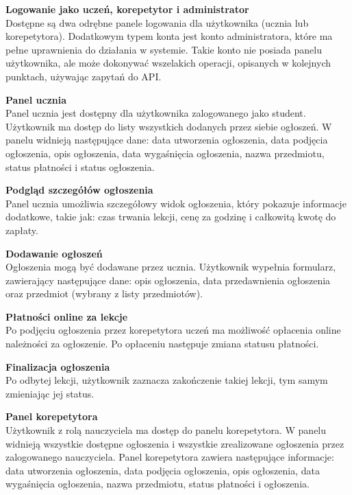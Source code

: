\documentclass[12pt]{article}
\numberwithin{figure}{section}
\begin{document}
\begin{sloppypar}
\noindent
\textbf{Logowanie jako uczeń, korepetytor i administrator}\\
\indent  
Dostępne są dwa odrębne panele logowania dla użytkownika (ucznia lub korepetytora). Dodatkowym typem konta jest konto administratora, które ma pełne uprawnienia do działania w systemie. Takie konto nie posiada panelu użytkownika, ale może dokonywać wszelakich operacji, opisanych w kolejnych punktach, używając zapytań do API.

\noindent
\textbf{Panel ucznia}\\
\indent
Panel ucznia jest dostępny dla użytkownika zalogowanego jako student. Użytkownik ma dostęp do listy wszystkich dodanych przez siebie ogłoszeń. W panelu widnieją następujące dane: data utworzenia ogłoszenia, data podjęcia ogłoszenia, opis ogłoszenia, data wygaśnięcia ogłoszenia, nazwa przedmiotu, status płatności i status ogłoszenia.

\noindent
\textbf{Podgląd szczegółów ogłoszenia}\\
\indent
Panel ucznia umożliwia szczegółowy widok ogłoszenia, który pokazuje informacje dodatkowe, takie jak: czas trwania lekcji, cenę za godzinę i całkowitą kwotę do zapłaty. 

\noindent
\textbf{Dodawanie ogłoszeń}\\
\indent
Ogłoszenia mogą być dodawane przez ucznia. Użytkownik wypełnia formularz, zawierający następujące dane: opis ogłoszenia, data przedawnienia ogłoszenia oraz przedmiot (wybrany z listy przedmiotów). 

\noindent
\textbf{Płatności online za lekcje}\\
\indent
Po podjęciu ogłoszenia przez korepetytora uczeń ma możliwość opłacenia online należności za ogłoszenie. Po opłaceniu następuje zmiana statusu płatności. 

\noindent
\textbf{Finalizacja ogłoszenia}\\
\indent
Po odbytej lekcji, użytkownik zaznacza zakończenie takiej lekcji, tym samym zmieniając jej status.

\noindent
\textbf{Panel korepetytora}\\
\indent
Użytkownik z rolą nauczyciela ma dostęp do panelu korepetytora. W panelu widnieją wszystkie dostępne ogłoszenia i wszystkie zrealizowane ogłoszenia przez zalogowanego nauczyciela. Panel korepetytora zawiera następujące informacje: data utworzenia ogłoszenia, data podjęcia ogłoszenia, opis ogłoszenia, data wygaśnięcia ogłoszenia, nazwa przedmiotu, status płatności i ogłoszenia.


\end{sloppypar}
\end{document}
